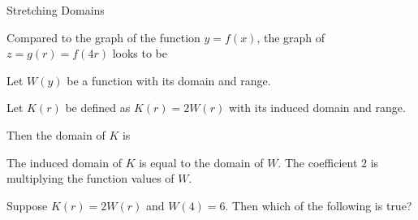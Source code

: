 \documentclass{ximera}
\begin{document}
\begin{example} Stretching Domains

Compared to the graph of the function $y=f(x)$, the graph of $z=g(r)=f(4r)$ looks to be 

\begin{multipleChoice}

\end{multipleChoice}


\end{example}






















































Let $W(y)$ be a function with its domain and range.

Let $K(r)$ be defined as $K(r) = 2 W(r)$ with its induced domain and range.


Then the domain of $K$ is

\begin{multipleChoice}
\end{multipleChoice}

The induced domain of $K$ is equal to the domain of $W$.  The coefficient $2$ is multiplying the function values of $W$.



\begin{question}


Suppose $K(r) = 2 W(r)$ and $W(4) = 6$.  Then which of the following is true?

\begin{multipleChoice}
\end{multipleChoice}


\end{question}
\end{document}
